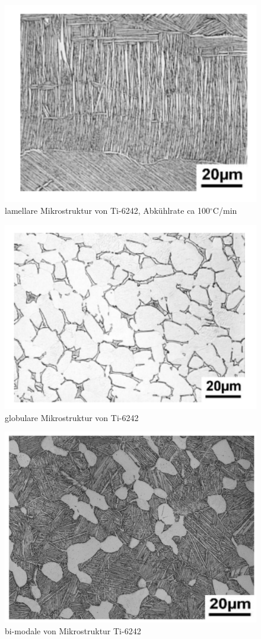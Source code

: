 \begin{itemize}
\begin{figure}[h]
	\centering
	\includegraphics[width=0.6\linewidth]{./Bilder/Abbildung 3.png}
	\caption[Abbildung 3]{lamellare Mikrostruktur von Ti-6242, Abkühlrate ca 100$^\circ$C/min \cite{Lutjering.2007}}
	\label{fig:abbildung-3}
\end{figure}

\begin{figure}[h]
	\centering
	\includegraphics[width=0.6\linewidth]{./Bilder/Abbildung 5.png}
	\caption[Abbildung 5]{globulare Mikrostruktur von Ti-6242 \cite{Lutjering.2007}}
	\label{fig:abbildung-5}
\end{figure}

\pagebreak

\begin{figure}[h]
	\centering
	\includegraphics[width=0.5\linewidth]{./Bilder/Abbildung 4.png}
	\caption[Abbildung 4]{bi-modale von Mikrostruktur Ti-6242}
	\label{fig:abbildung-4}
\end{figure}

\end{itemize} 

